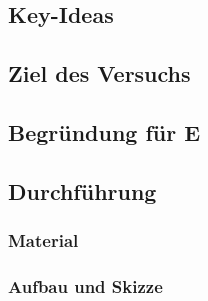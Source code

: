 

\subsection*{Key-Ideas}




\subsection*{Ziel des Versuchs}




\subsection*{Begründung für E}




\subsection*{Durchführung}

\subsubsection*{Material}




\subsubsection*{Aufbau und Skizze}





